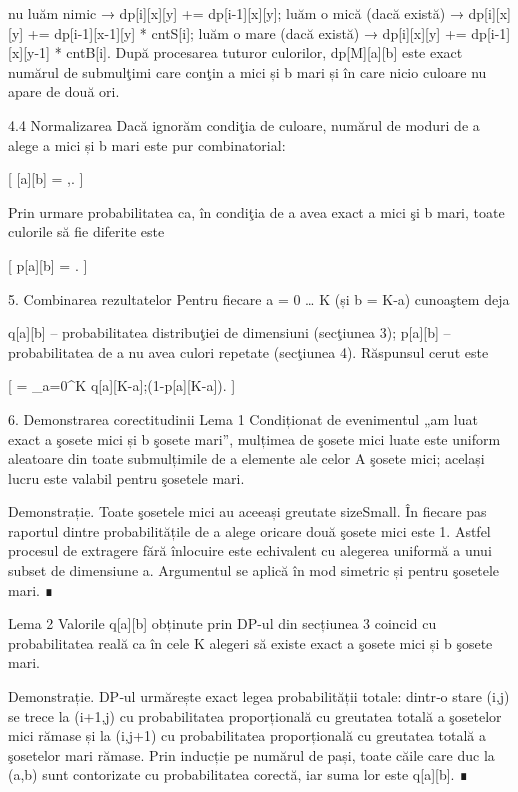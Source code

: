 nu luăm nimic → dp[i][x][y] += dp[i-1][x][y];
luăm o mică (dacă există) → dp[i][x][y] += dp[i-1][x-1][y] * cntS[i];
luăm o mare (dacă există) → dp[i][x][y] += dp[i-1][x][y-1] * cntB[i].
După procesarea tuturor culorilor, dp[M][a][b] este exact numărul de submulţimi care conţin a mici și b mari și în care nicio culoare nu apare de două ori.

4.4 Normalizarea
Dacă ignorăm condiţia de culoare, numărul de moduri de a alege a mici și b mari este pur combinatorial:

[ [a][b] = ,. ]

Prin urmare probabilitatea ca, în condiţia de a avea exact a mici şi b mari, toate culorile să fie diferite este

[ p[a][b] =  . ]

5. Combinarea rezultatelor
Pentru fiecare a = 0 … K (și b = K‑a) cunoaştem deja

q[a][b] – probabilitatea distribuţiei de dimensiuni (secţiunea 3);
p[a][b] – probabilitatea de a nu avea culori repetate (secţiunea 4).
Răspunsul cerut este

[ = \sum_{a=0}^{K} q[a][K-a];\bigl(1-p[a][K-a]\bigr). ]

6. Demonstrarea corectitudinii
Lema 1
Condiționat de evenimentul „am luat exact a şosete mici și b şosete mari”, mulțimea de şosete mici luate este uniform aleatoare din toate submulțimile de a elemente ale celor A şosete mici; același lucru este valabil pentru şosetele mari.

Demonstrație.
Toate şosetele mici au aceeași greutate sizeSmall. În fiecare pas raportul dintre probabilitățile de a alege oricare două şosete mici este 1. Astfel procesul de extragere fără înlocuire este echivalent cu alegerea uniformă a unui subset de dimensiune a. Argumentul se aplică în mod simetric și pentru şosetele mari. ∎

Lema 2
Valorile q[a][b] obținute prin DP-ul din secțiunea 3 coincid cu probabilitatea reală ca în cele K alegeri să existe exact a şosete mici și b şosete mari.

Demonstrație.
DP‑ul urmărește exact legea probabilității totale: dintr‑o stare (i,j) se trece la (i+1,j) cu probabilitatea proporțională cu greutatea totală a şosetelor mici rămase și la (i,j+1) cu probabilitatea proporțională cu greutatea totală a şosetelor mari rămase. Prin inducție pe numărul de pași, toate căile care duc la (a,b) sunt contorizate cu probabilitatea corectă, iar suma lor este q[a][b]. ∎

